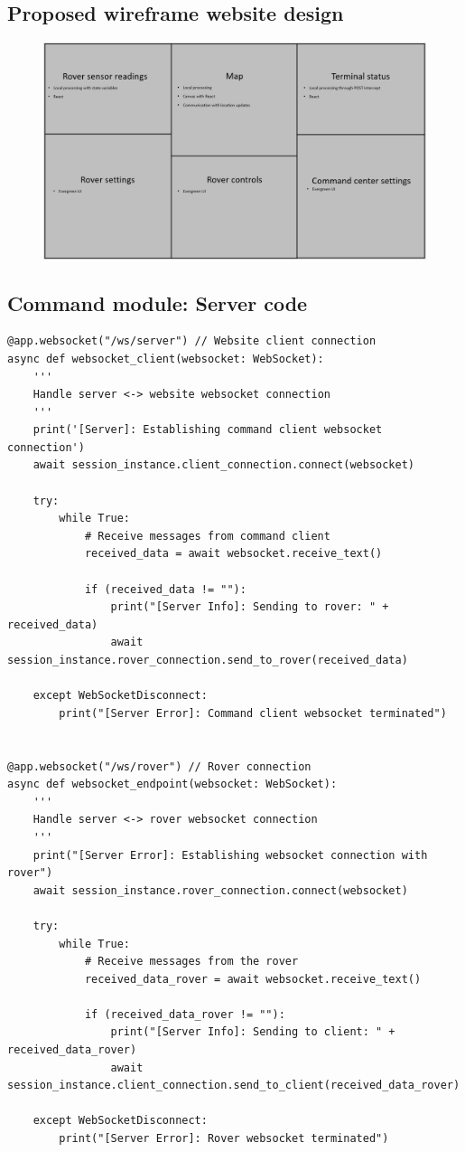 \documentclass[11pt, a4paper]{article}
\begin{document}
\subsection{Proposed wireframe website design}

\begin{figure} [h!]
    \centering
    \includegraphics[scale=0.5]{Wireframe.JPG}
\end{figure}

\pagebreak
\subsection{Command module: Server code}
\begin{lstlisting}
@app.websocket("/ws/server") // Website client connection
async def websocket_client(websocket: WebSocket):
    '''
    Handle server <-> website websocket connection
    '''
    print('[Server]: Establishing command client websocket connection')
    await session_instance.client_connection.connect(websocket)
    
    try:
        while True:
            # Receive messages from command client 
            received_data = await websocket.receive_text()
                  
            if (received_data != ""):
                print("[Server Info]: Sending to rover: " + received_data)              
                await session_instance.rover_connection.send_to_rover(received_data)
            
    except WebSocketDisconnect:
        print("[Server Error]: Command client websocket terminated")


@app.websocket("/ws/rover") // Rover connection
async def websocket_endpoint(websocket: WebSocket):
    '''
    Handle server <-> rover websocket connection
    '''
    print("[Server Error]: Establishing websocket connection with rover")
    await session_instance.rover_connection.connect(websocket)
    
    try:
        while True:
            # Receive messages from the rover 
            received_data_rover = await websocket.receive_text()
            
            if (received_data_rover != ""):
                print("[Server Info]: Sending to client: " + received_data_rover)  
                await session_instance.client_connection.send_to_client(received_data_rover)
                
    except WebSocketDisconnect:
        print("[Server Error]: Rover websocket terminated")
\end{lstlisting}
\end{document}
